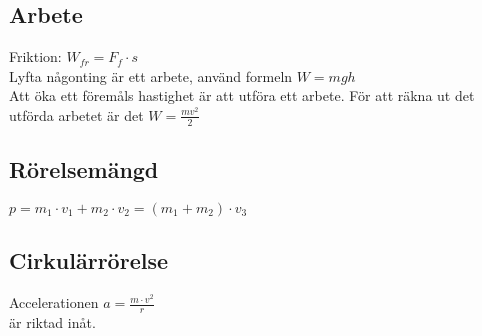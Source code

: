 \subsection{Arbete}
Friktion: 
\begin{math}
    W_{fr} = F_f \cdot s
\end{math} \\[2pt]

Lyfta någonting är ett arbete, använd formeln 
\begin{math}
    W = mgh
\end{math} \\[2pt]
Att öka ett föremåls hastighet är att utföra ett arbete. För att räkna ut det utförda arbetet är det
\begin{math}
    W = \frac{mv^2}{2}
\end{math} \\[2pt]

\subsection{Rörelsemängd}
\begin{math}
    p = m_1 \cdot v_1 + m_2 \cdot v_2 = (m_1 + m_2) \cdot v_3
\end{math} \\[2pt]

\subsection{Cirkulärrörelse}
Accelerationen
\begin{math}
    a = \frac{m \cdot v^2}{r}
\end{math} \\[2pt]
är riktad inåt.
